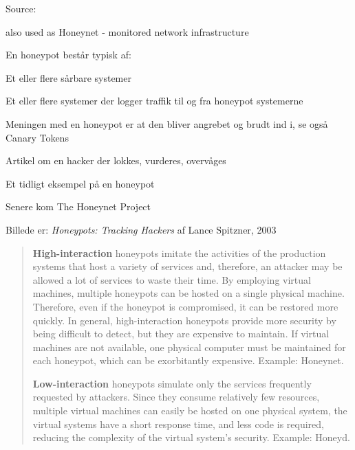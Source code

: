 \documentclass[Screen16to9,17pt]{foils}
\begin{document}
Source:

also used as Honeynet - monitored network infrastructure

\begin{list1}
\item En honeypot består typisk af:
  \begin{list2}
    \item Et eller flere sårbare systemer
\item Et eller flere systemer der logger traffik til og fra honeypot
  systemerne
  \end{list2}
\item Meningen med en honeypot er at den bliver angrebet og brudt ind
  i, se også Canary Tokens
\end{list1}




\begin{list1}
\item Artikel om en hacker der lokkes, vurderes, overvåges
\item Et tidligt eksempel på en honeypot
\item Senere kom The Honeynet Project 
\item Billede er: \emph{Honeypots: Tracking Hackers}
af Lance Spitzner, 2003
\end{list1}



\begin{quote}
{\bf High-interaction} honeypots imitate the activities of the production systems that host a variety of services and, therefore, an attacker may be allowed a lot of services to waste their time. By employing virtual machines, multiple honeypots can be hosted on a single physical machine. Therefore, even if the honeypot is compromised, it can be restored more quickly. In general, high-interaction honeypots provide more security by being difficult to detect, but they are expensive to maintain. If virtual machines are not available, one physical computer must be maintained for each honeypot, which can be exorbitantly expensive. Example: Honeynet.

{\bf Low-interaction} honeypots simulate only the services frequently requested by attackers. Since they consume relatively few resources, multiple virtual machines can easily be hosted on one physical system, the virtual systems have a short response time, and less code is required, reducing the complexity of the virtual system's security. Example: Honeyd.
\end{quote}
\end{document}
